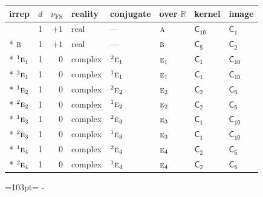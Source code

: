\documentclass[10pt,a4paper]{article}
\newcommand{\needspace}[1]{\par\penalty-100\begingroup\dimen0=#1\relax\dimen2=\pagegoal
  \advance\dimen2-\pagetotal\ifdim\dimen0>\dimen2\relax\ifdim\dimen2>0pt\vfil\break\fi\fi
  \endgroup}
\numberwithin{equation}{section}
\newcommand{\grp}[1]{\mathsf{#1}}
\newcommand{\irr}[1]{\text{\normalfont\scshape #1}}
\newcommand{\conjpair}[1]{{}^{#1}}
\newcommand{\detbox}[1]{{\setlength{\fboxsep}{1pt}\fbox{#1}}}
\newcommand{\fsind}{\nu_{\mathrm{FS}}}
\begin{document}
{\small\renewcommand{\arraystretch}{1.25}\setlength{\tabcolsep}{4pt}\begin{longtable}{@{}lrrlllll@{}}\toprule
irrep & $d$ & $\fsind$ & reality & conjugate & over $\mathbb{R}$ & kernel & image\\\midrule\endhead
\bottomrule\endfoot\endlastfoot
\detbox{$\irr{a}$} & 1 & $+1$ & real & --- & $\irr{a}$ & \href{C10.pdf}{$\grp{C_{10}}$} & \href{C1.pdf}{$\grp{C_{1}}$}\\*
$\irr{b}$ & 1 & $+1$ & real & --- & $\irr{b}$ & \href{C5.pdf}{$\grp{C_{5}}$} & \href{C2.pdf}{$\grp{C_{2}}$}\\*
$\conjpair{1}\irr{e}_{1}$ & 1 & $0$ & complex & $\conjpair{2}\irr{e}_{1}$ & $\irr{e}_{1}$ & \href{C1.pdf}{$\grp{C_{1}}$} & \href{C10.pdf}{$\grp{C_{10}}$}\\*
$\conjpair{2}\irr{e}_{1}$ & 1 & $0$ & complex & $\conjpair{1}\irr{e}_{1}$ & $\irr{e}_{1}$ & \href{C1.pdf}{$\grp{C_{1}}$} & \href{C10.pdf}{$\grp{C_{10}}$}\\*
$\conjpair{1}\irr{e}_{2}$ & 1 & $0$ & complex & $\conjpair{2}\irr{e}_{2}$ & $\irr{e}_{2}$ & \href{C2.pdf}{$\grp{C_{2}}$} & \href{C5.pdf}{$\grp{C_{5}}$}\\*
$\conjpair{2}\irr{e}_{2}$ & 1 & $0$ & complex & $\conjpair{1}\irr{e}_{2}$ & $\irr{e}_{2}$ & \href{C2.pdf}{$\grp{C_{2}}$} & \href{C5.pdf}{$\grp{C_{5}}$}\\*
$\conjpair{1}\irr{e}_{3}$ & 1 & $0$ & complex & $\conjpair{2}\irr{e}_{3}$ & $\irr{e}_{3}$ & \href{C1.pdf}{$\grp{C_{1}}$} & \href{C10.pdf}{$\grp{C_{10}}$}\\*
$\conjpair{2}\irr{e}_{3}$ & 1 & $0$ & complex & $\conjpair{1}\irr{e}_{3}$ & $\irr{e}_{3}$ & \href{C1.pdf}{$\grp{C_{1}}$} & \href{C10.pdf}{$\grp{C_{10}}$}\\*
$\conjpair{1}\irr{e}_{4}$ & 1 & $0$ & complex & $\conjpair{2}\irr{e}_{4}$ & $\irr{e}_{4}$ & \href{C2.pdf}{$\grp{C_{2}}$} & \href{C5.pdf}{$\grp{C_{5}}$}\\*
$\conjpair{2}\irr{e}_{4}$ & 1 & $0$ & complex & $\conjpair{1}\irr{e}_{4}$ & $\irr{e}_{4}$ & \href{C2.pdf}{$\grp{C_{2}}$} & \href{C5.pdf}{$\grp{C_{5}}$}\\
\bottomrule\end{longtable}}
\needspace{103pt}
\end{document}
